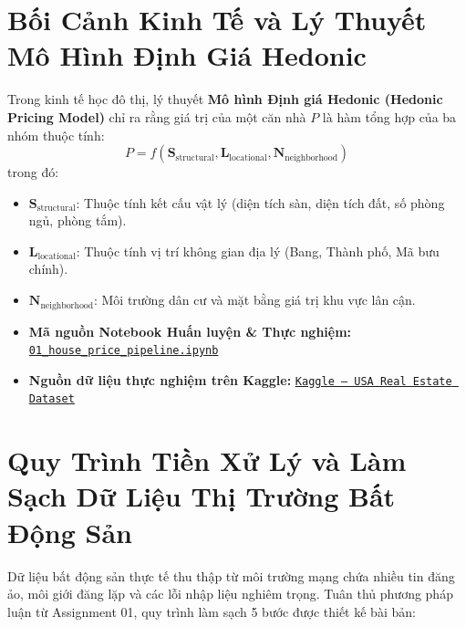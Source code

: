 \documentclass[12pt,a4paper]{report}
\begin{document}
\section{Bối Cảnh Kinh Tế và Lý Thuyết Mô Hình Định Giá Hedonic}
Trong kinh tế học đô thị, lý thuyết \textbf{Mô hình Định giá Hedonic (Hedonic Pricing Model)} chỉ ra rằng giá trị của một căn nhà $P$ là hàm tổng hợp của ba nhóm thuộc tính:
\begin{equation}
P = f(\mathbf{S}_{\text{structural}}, \mathbf{L}_{\text{locational}}, \mathbf{N}_{\text{neighborhood}})
\end{equation}
trong đó:
\begin{itemize}
    \item $\mathbf{S}_{\text{structural}}$: Thuộc tính kết cấu vật lý (diện tích sàn, diện tích đất, số phòng ngủ, phòng tắm).
    \item $\mathbf{L}_{\text{locational}}$: Thuộc tính vị trí không gian địa lý (Bang, Thành phố, Mã bưu chính).
    \item $\mathbf{N}_{\text{neighborhood}}$: Môi trường dân cư và mặt bằng giá trị khu vực lân cận.
\end{itemize}

\begin{itemize}[leftmargin=1.5em, itemsep=2pt]
    \item \textbf{Mã nguồn Notebook Huấn luyện \& Thực nghiệm:} \href{https://github.com/phamtu2x5/INTELLIGENT-SYSTEM-DEVELOPMENT/blob/main/src/Assigment%2002/house_price/notebook/01_house_price_pipeline.ipynb}{\texttt{01\_house\_price\_pipeline.ipynb}}
    \item \textbf{Nguồn dữ liệu thực nghiệm trên Kaggle:} \href{https://www.kaggle.com/datasets/ahmedshahriarsakib/usa-real-estate-dataset}{\texttt{Kaggle -- USA Real Estate Dataset}}
\end{itemize}

\section{Quy Trình Tiền Xử Lý và Làm Sạch Dữ Liệu Thị Trường Bất Động Sản}
Dữ liệu bất động sản thực tế thu thập từ môi trường mạng chứa nhiều tin đăng ảo, môi giới đăng lặp và các lỗi nhập liệu nghiêm trọng. Tuân thủ phương pháp luận từ Assignment 01, quy trình làm sạch 5 bước được thiết kế bài bản:
\end{document}
